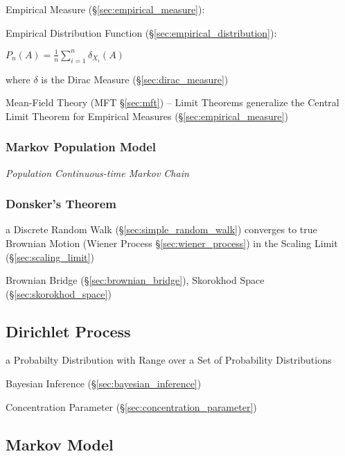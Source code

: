 Empirical Measure (\S\ref{sec:empirical_measure}):

Empirical Distribution Function (\S\ref{sec:empirical_distribution}):

$P_n(A) = \frac{1}{n}\sum_{i=1}^n \delta_{X_i}(A)$

where $\delta$ is the Dirac Measure (\S\ref{sec:dirac_measure})

\fist Mean-Field Theory (MFT \S\ref{sec:mft}) -- Limit Theorems generalize the
Central Limit Theorem for Empirical Measures (\S\ref{sec:empirical_measure})



\subsubsection{Markov Population Model}\label{sec:markov_population}

\emph{Population Continuous-time Markov Chain}



\subsubsection{Donsker's Theorem}\label{sec:donskers_theorem}

a Discrete Random Walk (\S\ref{sec:simple_random_walk}) converges to true
Brownian Motion (Wiener Process \S\ref{sec:wiener_process}) in the Scaling Limit
(\S\ref{sec:scaling_limit})

\fist Brownian Bridge (\S\ref{sec:brownian_bridge}), Skorokhod Space
(\S\ref{sec:skorokhod_space})



\subsection{Dirichlet Process}\label{sec:dirichlet_process}

a Probabilty Distribution with Range over a Set of Probability Distributions

Bayesian Inference (\S\ref{sec:bayesian_inference})

Concentration Parameter (\S\ref{sec:concentration_parameter})



\subsection{Markov Model}\label{sec:markov_model}

